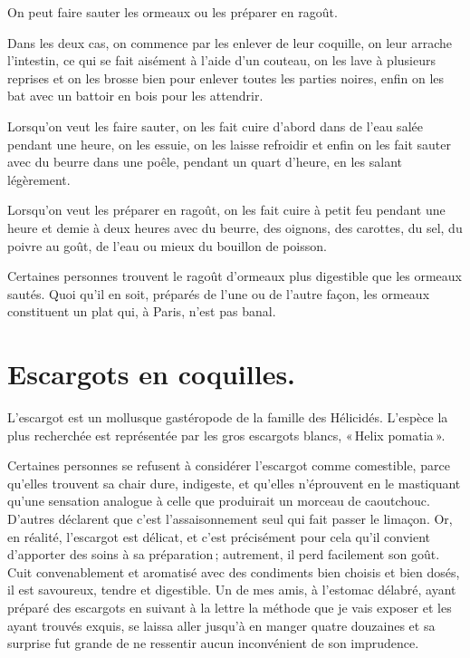 On peut faire sauter les ormeaux ou les préparer en ragoût.

Dans les deux cas, on commence par les enlever de leur coquille, on leur
arrache l'intestin, ce qui se fait aisément à l'aide d'un couteau, on les lave
à plusieurs reprises et on les brosse bien pour enlever toutes les parties
noires, enfin on les bat avec un battoir en bois pour les attendrir.

Lorsqu'on veut les faire sauter, on les fait cuire d'abord dans de l'eau salée
pendant une heure, on les essuie, on les laisse refroidir et enfin on les fait
sauter avec du beurre dans une poêle, pendant un quart d'heure, en les salant
légèrement.

Lorsqu'on veut les préparer en ragoût, on les fait cuire à petit feu pendant
une heure et demie à deux heures avec du beurre, des oignons, des carottes, du
sel, du poivre au goût, de l’eau ou mieux du bouillon de poisson.

Certaines personnes trouvent le ragoût d'ormeaux plus digestible que les
ormeaux sautés. Quoi qu'il en soit, préparés de l'une ou de l'autre façon, les
ormeaux constituent un plat qui, à Paris, n'est pas banal.

\section*{\centering Escargots en coquilles.}
\label{pg0304} \hypertarget{p0304}{}

L'escargot est un mollusque gastéropode de la famille des Hélicidés. L'espèce
la plus recherchée est représentée par les gros escargots blancs, « Helix
pomatia ».

Certaines personnes se refusent à considérer l'escargot comme comestible, parce
qu'elles trouvent sa chair dure, indigeste, et qu'elles n'éprouvent en le
mastiquant qu'une sensation analogue à celle que produirait un morceau de
caoutchouc. D'autres déclarent que c'est l’assaisonnement seul qui fait passer
le limaçon. Or, en réalité, l'escargot est délicat, et c'est précisément pour
cela qu'il convient d'apporter des soins à sa préparation ; autrement, il perd
facilement son goût. Cuit convenablement et aromatisé avec des condiments bien
choisis et bien dosés, il est savoureux, tendre et digestible. Un de mes amis,
à l'estomac délabré, ayant préparé des escargots en suivant à la lettre la
méthode que je vais exposer et les ayant trouvés exquis, se laissa aller
jusqu'à en manger quatre douzaines et sa surprise fut grande de ne ressentir
aucun inconvénient de son imprudence.

